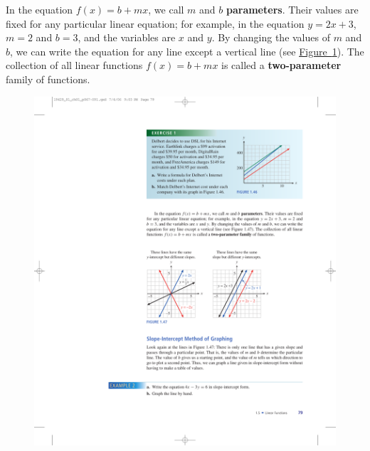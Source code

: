 \documentclass[10pt,]{book}
\newcommand{\terminology}[1]{\textbf{#1}}
\theoremstyle{plain}
\theoremstyle{definition}
\theoremstyle{definition}
\theoremstyle{definition}
\theoremstyle{definition}
\numberwithin{equation}{part}
\begin{document}
In the equation \(f (x) = b + mx\), we call \(m\) and \(b\) \terminology{parameters}. Their values are fixed for any particular linear equation; for example, in the equation \(y = 2x + 3\), \(m = 2\) and \(b = 3\), and the variables are \(x\) and \(y\). By changing the values of \(m\) and \(b\), we can write the equation for any line except a vertical line (see \hyperref[fig-slope-vs-intercept]{Figure~\ref{fig-slope-vs-intercept}}). The collection of all linear functions \(f (x) = b + mx\) is called a \terminology{two-parameter} family of functions.%
\begin{figure}
\centering
\includegraphics[width=1\linewidth]{images/fig-slope-vs-intercept}
\caption{\label{fig-slope-vs-intercept}}
\end{figure}
\typeout{************************************************}
\typeout{************************************************}
\end{document}
